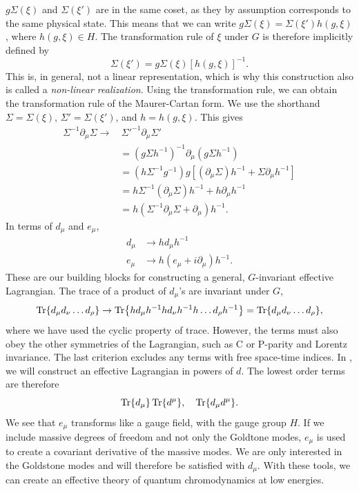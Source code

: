 $g\Sigma(\xi)$ and $\Sigma(\xi')$ are in the same coset, as they by assumption corresponds to the same physical state.
This means that we can write $g\Sigma(\xi) = \Sigma(\xi') h(g, \xi)$, where $h(g, \xi) \in H$.
The transformation rule of $\xi$ under $G$ is therefore implicitly defined by
\begin{equation}
    \Sigma(\xi') = g \Sigma(\xi) [h(g, \xi)]^{-1}.
\end{equation}
%
This is, in general, not a linear representation, which is why this construction also is called a \emph{non-linear realization}.
Using the transformation rule, we can obtain the transformation rule of the Maurer-Cartan form.
We use the shorthand $\Sigma = \Sigma(\xi),\, \Sigma' = \Sigma(\xi')$, and $h = h(g, \xi)$.
This gives
\begin{align*}
    \Sigma^{-1} \partial_\mu \Sigma
    \rightarrow 
    & \, \Sigma'^{-1} \partial_\mu \Sigma' \\
    & = (g \Sigma h^{-1})^{-1} \partial_\mu (g \Sigma h^{-1}) \\
    & = (h \Sigma^{-1} g^{-1}) g [(\partial_\mu \Sigma)h^{-1} + \Sigma \partial_\mu h^{-1}] \\
    & = h \Sigma^{-1} (\partial_\mu \Sigma) h^{-1}
    + h \partial_\mu h^{-1} \\
    & = h (\Sigma^{-1} \partial_\mu \Sigma + \partial_\mu) h^{-1}.
\end{align*}
In terms of $d_\mu$ and $e_\mu$,
\begin{align}
    d_\mu & \rightarrow h d_\mu h^{-1} \\
    e_\mu & \rightarrow h (e_\mu + i\partial_\mu )h^{-1}.
\end{align}
%
These are our building blocks for constructing a general, $G$-invariant effective Lagrangian.
The trace of a product of $d_\mu$'s are invariant under $G$,
\begin{equation}
    \Tr{d_\mu d_\nu \dots d_\rho} 
    \rightarrow
    \Tr{h d_\mu h^{-1} h d_\nu h^{-1} h \dots d_\rho h^{-1}}
    = \Tr{d_\mu d_\nu \dots d_\rho},
\end{equation}
%
where we have used the cyclic property of trace.
However, the terms must also obey the other symmetries of the Lagrangian, such as C or P-parity and Lorentz invariance.
The last criterion excludes any terms with free space-time indices.
In , we will construct an effective Lagrangian in powers of $d$.
The lowest order terms are therefore
\begin{equation}
    \label{first order terms CCWZ}
    \Tr{d_\mu} \Tr{d^\mu}, 
    \quad 
    \Tr{d_\mu d^\mu}.
\end{equation}
%
We see that $e_\mu$ transforms like a gauge field, with the gauge group $H$.
If we include massive degrees of freedom and not only the Goldtone modes, $e_\mu$ is used to create a covariant derivative of the massive modes.
We are only interested in the Goldstone modes and will therefore be satisfied with $d_\mu$.
With these tools, we can create an effective theory of quantum chromodynamics at low energies.

